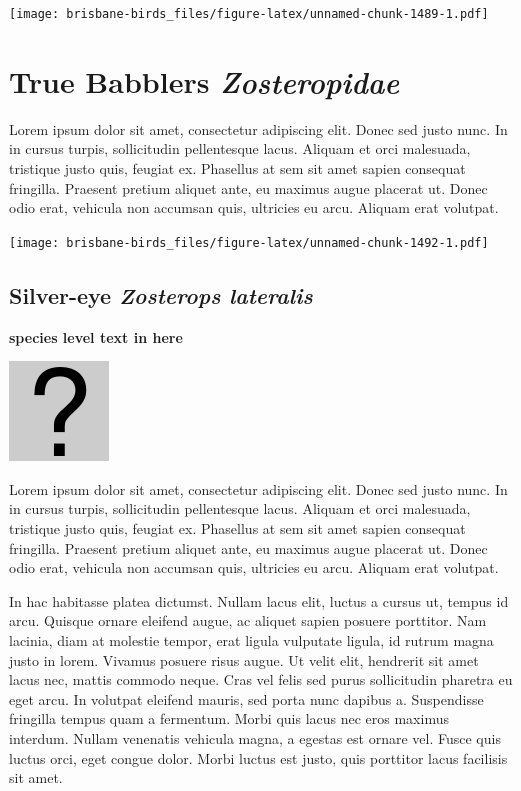 \documentclass[]{book}
\let\origfigure\figure
\let\endorigfigure\endfigure
\renewenvironment{figure}[1][2] {
  \expandafter\origfigure\expandafter[H]
} {
  \endorigfigure
}
\begin{document}
\begin{figure}
\centering
\texttt{[image: brisbane-birds\_files/figure-latex/unnamed-chunk-1489-1.pdf]}
\caption{\label{fig:unnamed-chunk-1489}insert figure caption}
\end{figure}

\chapter{\texorpdfstring{True Babblers
\emph{Zosteropidae}}{True Babblers Zosteropidae}}\label{true-babblers-zosteropidae}

Lorem ipsum dolor sit amet, consectetur adipiscing elit. Donec sed justo
nunc. In in cursus turpis, sollicitudin pellentesque lacus. Aliquam et
orci malesuada, tristique justo quis, feugiat ex. Phasellus at sem sit
amet sapien consequat fringilla. Praesent pretium aliquet ante, eu
maximus augue placerat ut. Donec odio erat, vehicula non accumsan quis,
ultricies eu arcu. Aliquam erat volutpat.

\texttt{[image: brisbane-birds\_files/figure-latex/unnamed-chunk-1492-1.pdf]}

\section{\texorpdfstring{Silver-eye \emph{Zosterops
lateralis}}{Silver-eye Zosterops lateralis}}\label{silver-eye-zosterops-lateralis}

\textbf{species level text in here}

\begin{figure}
\centering
\includegraphics{assets/missing.png}
\caption{No image for species}
\end{figure}

Lorem ipsum dolor sit amet, consectetur adipiscing elit. Donec sed justo
nunc. In in cursus turpis, sollicitudin pellentesque lacus. Aliquam et
orci malesuada, tristique justo quis, feugiat ex. Phasellus at sem sit
amet sapien consequat fringilla. Praesent pretium aliquet ante, eu
maximus augue placerat ut. Donec odio erat, vehicula non accumsan quis,
ultricies eu arcu. Aliquam erat volutpat.

In hac habitasse platea dictumst. Nullam lacus elit, luctus a cursus ut,
tempus id arcu. Quisque ornare eleifend augue, ac aliquet sapien posuere
porttitor. Nam lacinia, diam at molestie tempor, erat ligula vulputate
ligula, id rutrum magna justo in lorem. Vivamus posuere risus augue. Ut
velit elit, hendrerit sit amet lacus nec, mattis commodo neque. Cras vel
felis sed purus sollicitudin pharetra eu eget arcu. In volutpat eleifend
mauris, sed porta nunc dapibus a. Suspendisse fringilla tempus quam a
fermentum. Morbi quis lacus nec eros maximus interdum. Nullam venenatis
vehicula magna, a egestas est ornare vel. Fusce quis luctus orci, eget
congue dolor. Morbi luctus est justo, quis porttitor lacus facilisis sit
amet.
\end{document}
